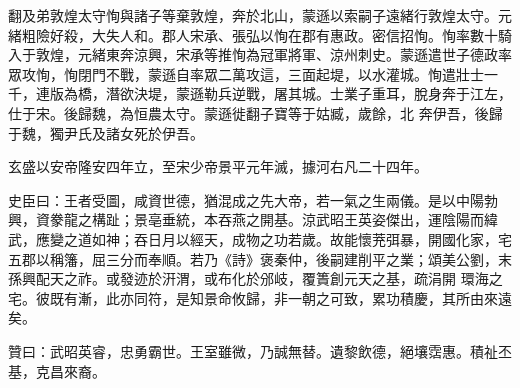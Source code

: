 \begin{pinyinscope}
 翻及弟敦煌太守恂與諸子等棄敦煌，奔於北山，蒙遜以索嗣子遠緒行敦煌太守。元緒粗險好殺，大失人和。郡人宋承、張弘以恂在郡有惠政。密信招恂。恂率數十騎入于敦煌，元緒東奔涼興，宋承等推恂為冠軍將軍、涼州刺史。蒙遜遣世子德政率眾攻恂，恂閉門不戰，蒙遜自率眾二萬攻這，三面起堤，以水灌城。恂遣壯士一千，連版為橋，潛欲決堤，蒙遜勒兵逆戰，屠其城。士業子重耳，脫身奔于江左，仕于宋。後歸魏，為恒農太守。蒙遜徙翻子寶等于姑臧，歲餘，北
 奔伊吾，後歸于魏，獨尹氏及諸女死於伊吾。



 玄盛以安帝隆安四年立，至宋少帝景平元年滅，據河右凡二十四年。



 史臣曰：王者受圖，咸資世德，猶混成之先大帝，若一氣之生兩儀。是以中陽勃興，資豢龍之構趾；景亳垂統，本吞燕之開基。涼武昭王英姿傑出，運陰陽而緯武，應變之道如神；吞日月以經天，成物之功若歲。故能懷茺弭暴，開國化家，宅五郡以稱籓，屈三分而奉順。若乃《詩》褒秦仲，後嗣建削平之業；頌美公劉，末孫興配天之祚。或發迹於汧渭，或布化於邠岐，覆簣創元天之基，疏涓開
 環海之宅。彼既有漸，此亦同符，是知景命攸歸，非一朝之可致，累功積慶，其所由來遠矣。



 贊曰：武昭英睿，忠勇霸世。王室雖微，乃誠無替。遺黎飲德，絕壤霑惠。積祉丕基，克昌來裔。



\end{pinyinscope}